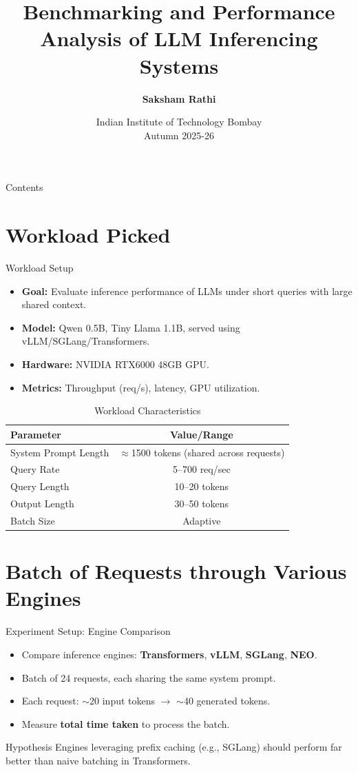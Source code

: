 \documentclass[Serif, 10pt, brown]{beamer}
\title[{Systems for LLMs}]{\sc Benchmarking and Performance Analysis of LLM Inferencing Systems}
\author[\ul{Saksham Rathi}]{{\textbf{Saksham Rathi}}}
\institute[UTD]{\sc\small Systems for LLMs\\ Under Prof. Mythili Vutukuru}
\date[UCI]{Indian Institute of Technology Bombay \\ Autumn 2025-26}
\theoremstyle{example}
\theoremstyle{plain}
\begin{document}
\frame{\titlepage}

\begin{frame}{Contents}
	\tableofcontents
\end{frame}

\section{Workload Picked}

\begin{frame}{Workload Setup}
\begin{itemize}
    \item \textbf{Goal:} Evaluate inference performance of LLMs under short queries with large shared context.
    \item \textbf{Model:} Qwen 0.5B, Tiny Llama 1.1B, served using vLLM/SGLang/Transformers.
    \item \textbf{Hardware:} NVIDIA RTX6000 48GB GPU.
    \item \textbf{Metrics:} Throughput (req/s), latency, GPU utilization.
\end{itemize}

\begin{table}[h!]
\centering
\scriptsize
\begin{tabular}{|l|c|}
\hline
\textbf{Parameter} & \textbf{Value/Range} \\
\hline
System Prompt Length & $\approx$1500 tokens (shared across requests) \\
Query Rate & 5–700 req/sec \\
Query Length & 10–20 tokens \\
Output Length & 30–50 tokens \\
Batch Size & Adaptive \\
\hline
\end{tabular}
\caption{Workload Characteristics}
\end{table}
\end{frame}


\section{Batch of Requests through Various Engines}
\begin{frame}{Experiment Setup: Engine Comparison}
\begin{itemize}
    \item Compare inference engines: \textbf{Transformers}, \textbf{vLLM}, \textbf{SGLang}, \textbf{NEO}.
    \item Batch of 24 requests, each sharing the same system prompt.
    \item Each request: $\sim$20 input tokens $\rightarrow$ $\sim$40 generated tokens.
    \item Measure \textbf{total time taken} to process the batch.
\end{itemize}

\begin{block}{Hypothesis}
Engines leveraging prefix caching (e.g., SGLang) should perform far better than naive batching in Transformers.
\end{block}
\end{frame}
\end{document}
